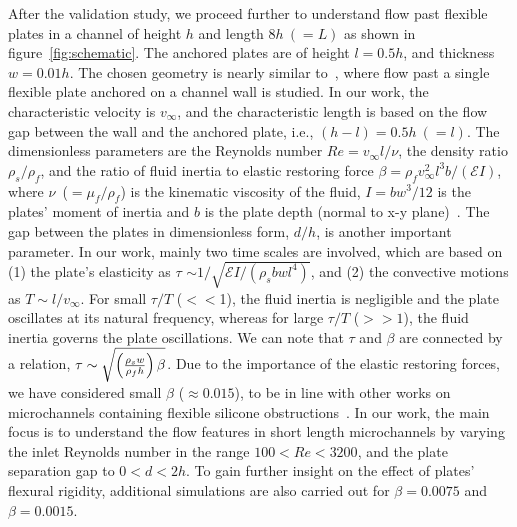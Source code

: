 \documentclass[aps,pre,twocolumn,aps,longbibliography]{revtex4-1}
\begin{document}
	
	
	
	
	After the validation study, we proceed further to understand flow past flexible plates in a channel of height $h$ and length $8h~(=L)$ as shown in figure~\ref{fig:schematic}. The anchored plates are of height $l=0.5h$, and thickness $w=0.01h$. The chosen geometry is nearly similar to~\cite{Jin2018}, where flow past a single flexible plate anchored on a channel wall is studied. In our work, the characteristic velocity is $v_\infty$, and the characteristic length is based on the flow gap between the wall and the anchored plate, i.e., $(h-l)=0.5h~(=l)$. The dimensionless parameters are the Reynolds number $Re=v_{\infty}l/\nu$, the density ratio $\rho_s/\rho_f$, and the ratio of fluid inertia to elastic restoring force $\beta=\rho_f v_{\infty}^2 l^3 b/(\mathcal{E}I)$, where $\nu$~($=\mu_f/\rho_f$) is the kinematic viscosity of the fluid, $I=bw^3/12$ is the plates' moment of inertia and $b$ is the plate depth (normal to x-y plane)~\cite{Bhageri2012,Pinelli2015}. The gap between the plates in dimensionless form, $d/h$, is another important parameter. In our work, mainly two time scales are involved, which are based on (1) the plate's elasticity as $\tau$ $\sim{1/\sqrt{\mathcal{E}I/(\rho_s bwl^4)}}$, and (2) the convective motions as $T\sim l/v_{\infty}$. For small $\tau/T$ ($<<$1), the fluid inertia is negligible and the plate oscillates at its natural frequency, whereas for large $\tau/T$ ($>>1$), the fluid inertia governs the plate oscillations. We can note that $\tau$ and $\beta$ are connected by a relation, $\tau\sim\sqrt{\left({\rho_s w\over\rho_f h}\right)\beta}$. Due to the importance of the elastic restoring forces, we have considered small $\beta$ ($\approx 0.015$), to be in line with other works on microchannels containing flexible silicone obstructions~\cite{Vandenberghe2004}. In our work, the main focus is to understand the flow features in short length microchannels by varying the inlet Reynolds number in the range $100<Re<3200$, and the plate separation gap to $0<d<2h$. To gain further insight on the effect of plates' flexural rigidity, additional simulations are also carried out for $\beta=0.0075$ and $\beta=0.0015$.
	
\end{document}
